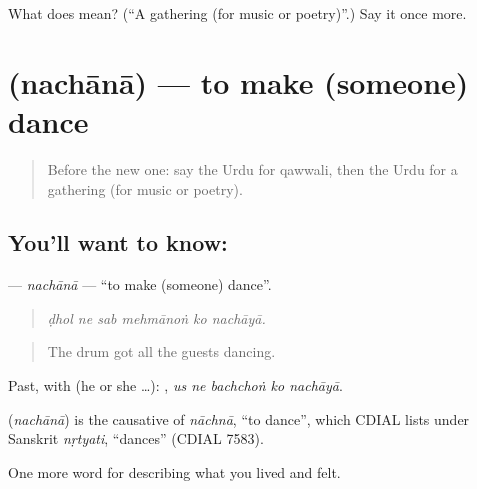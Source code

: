 \begin{tcolorbox}[breakable,colback=teal!4,colframe=teal!35!black,title={Before you move on}]
What does  mean? (\textquotedblleft{}A gathering (for music or poetry)\textquotedblright{}.) Say it once more.
\end{tcolorbox}
\section[\texorpdfstring{\ur{نچانا} (nachānā)}{نچانا (nachānā)}]{ (nachānā) — to make (someone) dance}

\label{lesson:UR-C519-nachana}



\begin{quote}
Before the new one: say the Urdu for qawwali, then the Urdu for a gathering (for music or poetry).
\end{quote}

\subsection*{You'll want to know: }
\textbf{} — \emph{nachānā} — \textquotedblleft{}to make (someone) dance\textquotedblright{}.

\begin{quote}
     
\end{quote}

\begin{quote}
\emph{ḍhol ne sab mehmānoṅ ko nachāyā.}
\end{quote}

\begin{quote}
The drum got all the guests dancing.
\end{quote}

Past, with  (he or she …):     , \emph{us ne bachchoṅ ko nachāyā}.

\begin{cousinweb}
\textbf{} (\emph{nachānā}) is the causative of \emph{nāchnā}, \textquotedblleft{}to dance\textquotedblright{}, which CDIAL lists under Sanskrit \emph{nṛtyati}, \textquotedblleft{}dances\textquotedblright{} (CDIAL 7583).
\end{cousinweb}

\begin{grammarlens}[title={What you've built}]
One more word for describing what you lived and felt.
\end{grammarlens}

